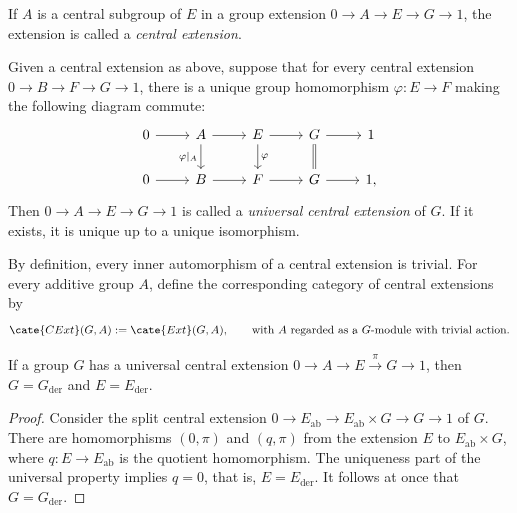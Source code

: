 \begin{definition}\label{def:central-ext}
	If $A$ is a central subgroup of $E$ in a group extension
	$0\to A\to E\to G\to1$, the extension is called a \emph{central
	extension}.

	Given a central extension as above, suppose that for every central
	extension $0\to B\to F\to G\to1$, there is a unique group homomorphism
	$\varphi:E\to F$ making the following diagram commute:
	\[\begin{tikzcd}
		0 \arrow[r] & A \arrow[r] \arrow[d,"{\varphi|_A}"'] &
		E \arrow[d,"\varphi"] \arrow[r] & G \arrow[equal,d] \arrow[r] & 1 \\
		0 \arrow[r] & B \arrow[r] & F \arrow[r] & G \arrow[r] & 1,
	\end{tikzcd}\]
	Then $0\to A\to E\to G\to1$ is called a \emph{universal central
	extension} of $G$. If it exists, it is unique up to a unique isomorphism.
\end{definition}

By definition, every inner automorphism of a central extension is trivial.
For every additive group $A$, define the corresponding category of central
extensions by
\[ \cate{CExt}(G,A):=\cate{Ext}(G,A),\qquad
	\text{with $A$ regarded as a $G$-module with trivial action}. \]

\begin{lemma}\label{prop:univ-central-ext-prep}
	If a group $G$ has a universal central extension
	$0\to A\to E\xrightarrow{\pi}G\to1$, then
	$G=G_{\mathrm{der}}$ and $E=E_{\mathrm{der}}$.
\end{lemma}
\begin{proof}
	Consider the split central extension
	$0\to E_{\mathrm{ab}}\to E_{\mathrm{ab}}\times G\to G\to1$ of $G$.
	There are homomorphisms $(0,\pi)$ and $(q,\pi)$ from the extension $E$
	to $E_{\mathrm{ab}}\times G$, where $q:E\to E_{\mathrm{ab}}$ is the
	quotient homomorphism. The uniqueness part of the universal property
	implies $q=0$, that is, $E=E_{\mathrm{der}}$. It follows at once that
	$G=G_{\mathrm{der}}$.
\end{proof}

